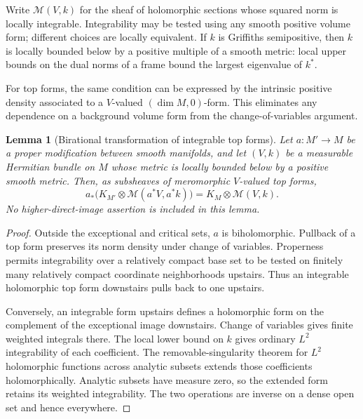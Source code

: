 \documentclass[11pt,reqno]{amsart}
\numberwithin{equation}{section}
\newtheorem{lemma}[theorem]{Lemma}
\theoremstyle{definition}
\theoremstyle{remark}
\newcommand{\MM}{\mathcal M}
\begin{document}
Write $\MM(V,k)$ for the sheaf of holomorphic sections whose squared norm is locally integrable. Integrability may be tested using any smooth positive volume form; different choices are locally equivalent. If $k$ is Griffiths semipositive, then $k$ is locally bounded below by a positive multiple of a smooth metric: local upper bounds on the dual norms of a frame bound the largest eigenvalue of $k^*$.

For top forms, the same condition can be expressed by the intrinsic positive density associated to a $V$-valued $(\dim M,0)$-form. This eliminates any dependence on a background volume form from the change-of-variables argument.

\begin{samepage}
\begin{lemma}[Birational transformation of integrable top forms]\label{lem:birational}
Let $a:M'\to M$ be a proper modification between smooth manifolds, and let $(V,k)$ be a measurable Hermitian bundle on $M$ whose metric is locally bounded below by a positive smooth metric. Then, as subsheaves of meromorphic $V$-valued top forms,
\begin{equation}\label{eq:birational}
 a_*\bigl(K_{M'}\otimes\MM(a^*V,a^*k)\bigr)
 =K_M\otimes\MM(V,k).
\end{equation}
No higher-direct-image assertion is included in this lemma.
\end{lemma}
\end{samepage}
\begin{proof}
Outside the exceptional and critical sets, $a$ is biholomorphic. Pullback of a top form preserves its norm density under change of variables. Properness permits integrability over a relatively compact base set to be tested on finitely many relatively compact coordinate neighborhoods upstairs. Thus an integrable holomorphic top form downstairs pulls back to one upstairs.

Conversely, an integrable form upstairs defines a holomorphic form on the complement of the exceptional image downstairs. Change of variables gives finite weighted integrals there. The local lower bound on $k$ gives ordinary $L^2$ integrability of each coefficient. The removable-singularity theorem for $L^2$ holomorphic functions across analytic subsets extends those coefficients holomorphically. Analytic subsets have measure zero, so the extended form retains its weighted integrability. The two operations are inverse on a dense open set and hence everywhere.
\end{proof}
\end{document}
